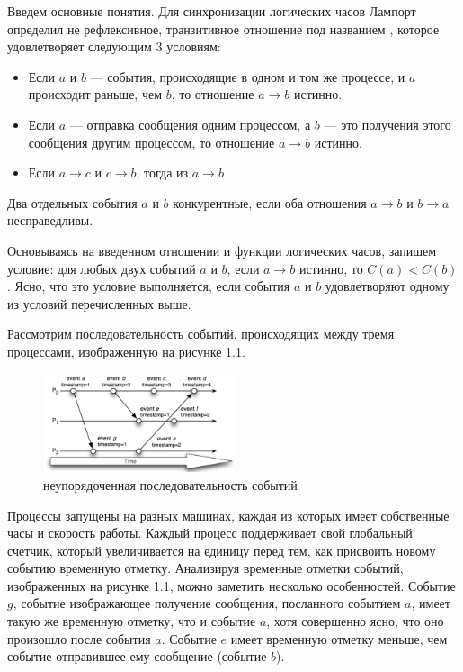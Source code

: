 Введем основные понятия. 
Для синхронизации логических часов Лампорт определил  не рефлексивное, транзитивное отношение под названием , которое удовлетворяет следующим 3 условиям: 
\begin{itemize}
\item Если $a$ и $b$ — события, происходящие в одном и том же процессе, и $a$
           происходит раньше, чем $b$, то отношение $a \rightarrow b$ истинно.
\item Если $a$ --- отправка сообщения одним процессом, а $b$ --- это получения этого сообщения другим процессом, то отношение $a \rightarrow b$ истинно.
\item Если $a \rightarrow c$ и $c \rightarrow b$, тогда из $a \rightarrow b$
\end{itemize}
Два отдельных события $a$ и $b$ конкурентные, если оба отношения $a \rightarrow b$ и $b \rightarrow a$ несправедливы.

Основываясь на введенном отношении и функции логических часов, запишем условие:
для любых двух событий $a$ и $b$, если $a \rightarrow b$ истинно, то $C(a) < C(b)$. Ясно, что это условие выполняется, если  события $a$ и $b$ удовлетворяют одному из условий перечисленных выше.

Рассмотрим последовательность событий, происходящих между тремя процессами, изображенную на рисунке 1.1.
\begin{figure}
\centering

\includegraphics[width=0.5\textwidth]{img/lamport1.png}
\caption{неупорядоченная последовательность событий}
\end{figure}
Процессы запущены на разных машинах, каждая из которых имеет собственные часы и скорость работы. Каждый процесс поддерживает свой глобальный счетчик, который увеличивается на единицу перед тем, как присвоить новому событию временную отметку. Анализируя временные отметки событий, изображенных на рисунке 1.1, можно заметить несколько особенностей. Событие $g$, событие изображающее получение сообщения, посланного событием $a$, имеет такую же временную отметку, что и событие $a$, хотя совершенно ясно, что оно произошло после события $a$. Событие $e$ имеет  временную отметку меньше, чем событие отправившее ему сообщение (событие $b$).

